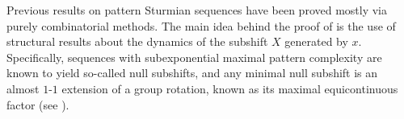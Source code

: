 \documentclass[11pt,reqno]{amsart}
\theoremstyle{definition}
\theoremstyle{plain}
\newcommand{\AuthornoteA}[2]{{\sf\small\color{magenta}{[#1: #2]}}}
\newcommand{\Anote}{\AuthornoteA{A}}
\begin{document}




Previous results on pattern Sturmian sequences have been proved mostly via purely combinatorial methods. The main idea behind the proof of  is the use of structural results about the dynamics of the subshift $X$ generated by $x$. Specifically, sequences with subexponential maximal pattern complexity are known to yield so-called null subshifts, and any minimal null subshift is an almost $1$-$1$ extension of a group rotation, known as its maximal equicontinuous factor (see ). %
\end{document}
